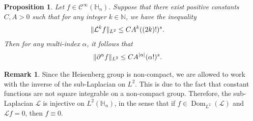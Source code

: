 \documentclass[12pt,oneside,a4paper]{book}
\numberwithin{equation}{section}     %
\theoremstyle{plain}
\newtheorem{proposition}[theorem]{Proposition}
\theoremstyle{definition}
\newtheorem{remark}[theorem]{Remark}
\DeclareMathOperator{\Dom}{Dom}
\newcommand{\N}{{\mathbb N}}
\newcommand{\h}{{\mathbb H}}
\newcommand{\slp}{{\mathcal L}}
\begin{document}
\begin{proposition}\label{PROP:Heis}
	Let $f \in\mathcal{C}^{\infty}(\h_n)$. Suppose that there exist positive constants $C,A>0$ such that for any integer $k\in\N$, we have the inequality 
	\begin{equation}\notag
	\|\slp^k f\|_{L^2}\leq CA^{k}((2k)!)^s.
	\end{equation} 
	Then for any multi-index $\alpha$, it follows that
	\begin{equation}\notag
	\|\partial^\alpha f\|_{L^2}\leq CA^{|\alpha|}(\alpha!)^s.
	\end{equation}
\end{proposition}
\begin{remark}
	Since the Heisenberg group is non-compact, we are allowed to work with the inverse of the sub-Laplacian on $L^2$. This is due to the fact that constant functions are not square integrable on a non-compact group. Therefore, the sub-Laplacian $\slp$ is injective on $L^2(\h_n)$, in the sense that if $f\in\Dom_{L^2}(\slp)$ and $\slp f=0$, then $f\equiv 0$.
\end{remark}
\end{document}
